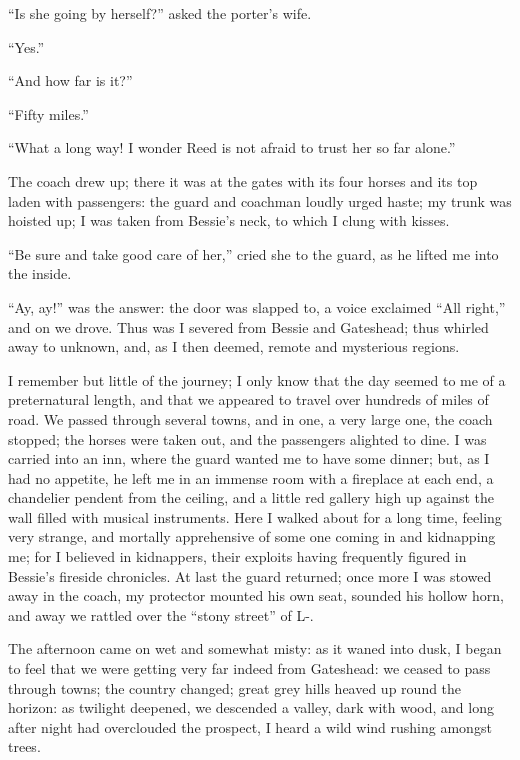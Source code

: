 \enquote{Is she going by herself?} asked the porter's wife.

\enquote{Yes.}

\enquote{And how far is it?}

\enquote{Fifty miles.}

\enquote{What a long way! I wonder \Mrs{} Reed is not afraid to trust her
	so far alone.}

The coach drew up; there it was at the gates with its four horses and
its top laden with passengers: the guard and coachman loudly urged
haste; my trunk was hoisted up; I was taken from Bessie's neck, to which
I clung with kisses.

\enquote{Be sure and take good care of her,} cried she to the guard, as
he lifted me into the inside.

\enquote{Ay, ay!} was the answer: the door was slapped to, a voice
exclaimed \enquote{All right,} and on we drove. Thus was I severed from
Bessie and Gateshead; thus whirled away to unknown, and, as I then
deemed, remote and mysterious regions.

I remember but little of the journey; I only know that the day seemed to
me of a preternatural length, and that we appeared to travel over
hundreds of miles of road. We passed through several towns, and in one,
a very large one, the coach stopped; the horses were taken out, and the
passengers alighted to dine. I was carried into an inn, where the guard
wanted me to have some dinner; but, as I had no appetite, he left me in
an immense room with a fireplace at each end, a chandelier pendent from
the ceiling, and a little red gallery high up against the wall filled
with musical instruments. Here I walked about for a long time, feeling
very strange, and mortally apprehensive of some one coming in and
kidnapping me; for I believed in kidnappers, their exploits having
frequently figured in Bessie's fireside chronicles. At last the guard
returned; once more I was stowed away in the coach, my protector mounted
his own seat, sounded his hollow horn, and away we rattled over the
\enquote{stony street} of L-.

The afternoon came on wet and somewhat misty: as it waned into dusk, I
began to feel that we were getting very far indeed from Gateshead: we
ceased to pass through towns; the country changed; great grey hills
heaved up round the horizon: as twilight deepened, we descended a
valley, dark with wood, and long after night had overclouded the
prospect, I heard a wild wind rushing amongst trees.

